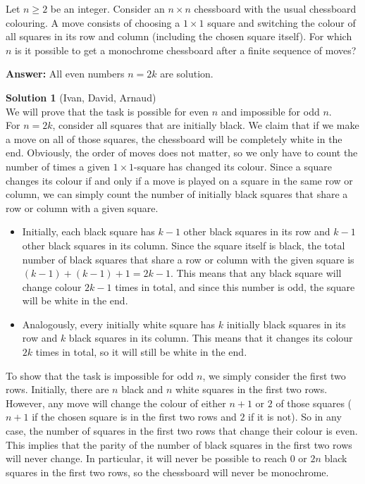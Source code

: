 Let $n\geq 2$ be an integer. Consider an $n\times n$ chessboard with the usual chessboard colouring. A move consists of choosing a $1\times 1$ square and switching the colour of all squares in its row and column (including the chosen square itself). For which $n$ is it possible to get a monochrome chessboard after a finite sequence of moves?

\textbf{Answer:} All even numbers $n=2k$ are solution.

\textbf{Solution 1} (Ivan, David, Arnaud)\\
We will prove that the task is possible for even $n$ and impossible for odd $n$.
\\
For $n=2k$, consider all squares that are initially black. We claim that if we make a move on all of those squares, the chessboard will be completely white in the end. Obviously, the order of moves does not matter, so we only have to count the number of times a given $1 \times 1$-square has changed its colour. Since a square changes its colour if and only if a move is played on a square in the same row or column, we can simply count the number of initially black squares that share a row or column with a given square.
\begin{itemize}
    \item Initially, each black square has $k-1$ other black squares in its row and $k-1$ other black squares in its column. Since the square itself is black, the total number of black squares that share a row or column with the given square is $(k-1)+(k-1)+1 = 2k-1$. This means that any black square will change colour $2k-1$ times in total, and since this number is odd, the square will be white in the end.
    \item Analogously, every initially white square has $k$ initially black squares in its row and $k$ black squares in its column. This means that it changes its colour $2k$ times in total, so it will still be white in the end.
\end{itemize}
To show that the task is impossible for odd $n$, we simply consider the first two rows. Initially, there are $n$ black and $n$ white squares in the first two rows. However, any move will change the colour of either $n+1$ or $2$ of those squares ($n+1$ if the chosen square is in the first two rows and $2$ if it is not). So in any case, the number of squares in the first two rows that change their colour is even. This implies that the parity of the number of black squares in the first two rows will never change. In particular, it will never be possible to reach $0$ or $2n$ black squares in the first two rows, so the chessboard will never be monochrome.
\newpage

